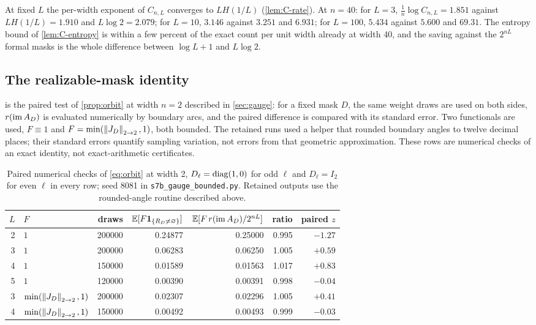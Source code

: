 At fixed $L$ the per-width exponent of $C_{n,L}$ converges to $LH(1/L)$ (\cref{lem:C-rate}). At $n=40$: for $L=3$, $\frac1n\log C_{n,L}=1.851$ against $LH(1/L)=1.910$ and $L\log2=2.079$; for $L=10$, $3.146$ against $3.251$ and $6.931$; for $L=100$, $5.434$ against $5.600$ and $69.31$. The entropy bound of \cref{lem:C-entropy} is within a few percent of the exact count per unit width already at width 40, and the saving against the $2^{nL}$ formal masks is the whole difference between $\log L+1$ and $L\log2$.

\subsection{The realizable-mask identity}

 is the paired test of \cref{prop:orbit} at width $n=2$ described in \cref{sec:gauge}: for a fixed mask $D$, the same weight draws are used on both sides, $r(\operatorname{im} A_D)$ is evaluated numerically by boundary arcs, and the paired difference is compared with its standard error. Two functionals are used, $F\equiv1$ and $F=\min(\left\lVert J_D\right\rVert_{2\to 2},1)$, both bounded. The retained runs used a helper that rounded boundary angles to twelve decimal places; their standard errors quantify sampling variation, not errors from that geometric approximation. These rows are numerical checks of an exact identity, not exact-arithmetic certificates.

\begin{table}[h]\centering
\begin{tabular}{rlrrrrr}
\toprule
$L$ & $F$ & draws & $\mathbb{E}[F\mathbf{1}_{\{R_D\ne\varnothing\}}]$ & $\mathbb{E}[F\,r(\operatorname{im} A_D)/2^{nL}]$ & ratio & paired $z$\\
\midrule
2 & $1$ & 200000 & 0.24877 & 0.25000 & 0.995 & $-1.27$\\
3 & $1$ & 200000 & 0.06283 & 0.06250 & 1.005 & $+0.59$\\
4 & $1$ & 150000 & 0.01589 & 0.01563 & 1.017 & $+0.83$\\
5 & $1$ & 120000 & 0.00390 & 0.00391 & 0.998 & $-0.04$\\
3 & $\min(\left\lVert J_D\right\rVert_{2\to 2},1)$ & 200000 & 0.02307 & 0.02296 & 1.005 & $+0.41$\\
4 & $\min(\left\lVert J_D\right\rVert_{2\to 2},1)$ & 150000 & 0.00492 & 0.00493 & 0.999 & $-0.03$\\
\bottomrule
\end{tabular}
\caption{Paired numerical checks of \cref{eq:orbit} at width 2, $D_\ell=\operatorname{diag}(1,0)$ for odd $\ell$ and $D_\ell=I_2$ for even $\ell$ in every row; seed 8081 in \texttt{s7b\_gauge\_bounded.py}. Retained outputs use the rounded-angle routine described above.}
\label{tab:orbit}
\end{table}

